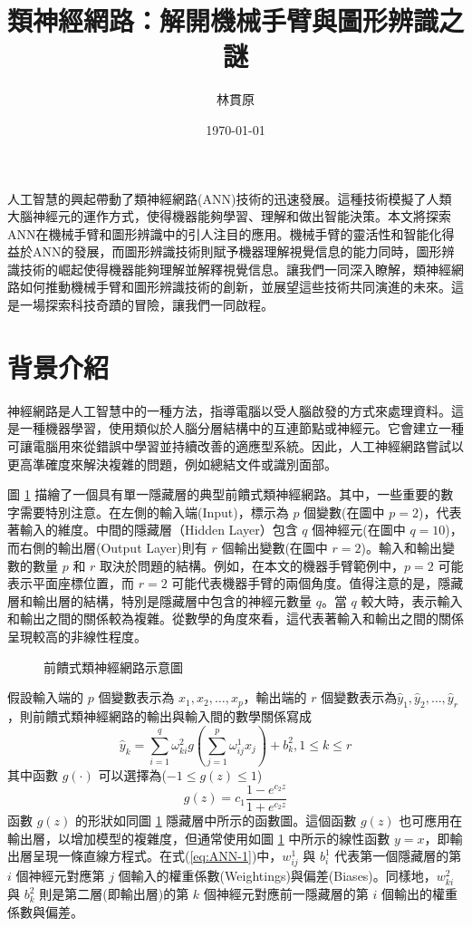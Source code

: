 \documentclass[12pt, a4paper]{article}
\title{類神經網路：解開機械手臂與圖形辨識之謎}
\author{{\KT 林貫原}}
\date{{\R \today }}
\begin{document}
\renewcommand{\tablename}{表}	
\renewcommand{\figurename}{圖}
\maketitle
\fontsize{12}{22pt}\selectfont 


人工智慧的興起帶動了類神經網路(ANN)技術的迅速發展。這種技術模擬了人類大腦神經元的運作方式，使得機器能夠學習、理解和做出智能決策。本文將探索ANN在機械手臂和圖形辨識中的引人注目的應用。機械手臂的靈活性和智能化得益於ANN的發展，而圖形辨識技術則賦予機器理解視覺信息的能力同時，圖形辨識技術的崛起使得機器能夠理解並解釋視覺信息。讓我們一同深入瞭解，類神經網路如何推動機械手臂和圖形辨識技術的創新，並展望這些技術共同演進的未來。這是一場探索科技奇蹟的冒險，讓我們一同啟程。

\section{背景介紹}
神經網路是人工智慧中的一種方法，指導電腦以受人腦啟發的方式來處理資料。這是一種機器學習，使用類似於人腦分層結構中的互連節點或神經元。它會建立一種可讓電腦用來從錯誤中學習並持續改善的適應型系統。因此，人工神經網路嘗試以更高準確度來解決複雜的問題，例如總結文件或識別面部。

圖 \ref{fig:ANN(hidden1)} 描繪了一個具有單一隱藏層的典型前饋式類神經網路。其中，一些重要的數字需要特別注意。在左側的輸入端(Input)，標示為 $p$ 個變數(在圖中 $p = 2$)，代表著輸入的維度。中間的隱藏層（Hidden Layer）包含 $q$ 個神經元(在圖中 $q = 10$)，而右側的輸出層(Output Layer)則有 $r$ 個輸出變數(在圖中 $r = 2$)。輸入和輸出變數的數量 $p$ 和 $r$ 取決於問題的結構。例如，在本文的機器手臂範例中，$p = 2$ 可能表示平面座標位置，而 $r = 2$ 可能代表機器手臂的兩個角度。值得注意的是，隱藏層和輸出層的結構，特別是隱藏層中包含的神經元數量 $q$。當 $q$ 較大時，表示輸入和輸出之間的關係較為複雜。從數學的角度來看，這代表著輸入和輸出之間的關係呈現較高的非線性程度。
\begin{figure}[H]
    \caption{前饋式類神經網路示意圖}
    \label{fig:ANN(hidden1)}
\end{figure}
假設輸入端的 $p$ 個變數表示為 $x_1, x_2,\dots , x_p$，輸出端的 $r$ 個變數表示為$\hat{y}_1, \hat{y}_2,\dots , \hat{y}_r$，則前饋式類神經網路的輸出與輸入間的數學關係寫成
\begin{equation}\label{eq:ANN-1}
\hat{y}_k=\sum_{i=1}^q\omega^2_{ki}g\left(\sum_{j=1}^p\omega^1_{ij}x_j\right)+b^2_k,1\leq k\leq r
\end{equation}
其中函數 $g(·)$ 可以選擇為($−1\leq g(z)\leq 1$)
\begin{equation}\label{eq:ANN-2}
g(z)=c_1\frac{1-e^{c_2z}}{1+e^{c_2z}}
\end{equation}
函數 $g(z)$ 的形狀如同圖 \ref{fig:ANN(hidden1)} 隱藏層中所示的函數圖。這個函數 $g(z)$ 也可應用在輸出層，以增加模型的複雜度，但通常使用如圖 \ref{fig:ANN(hidden1)} 中所示的線性函數 $y = x$，即輸出層呈現一條直線方程式。在式(\ref{eq:ANN-1})中，$w^1_{ij}$ 與 $b^1_i$ 代表第一個隱藏層的第 $i$ 個神經元對應第 $j$ 個輸入的權重係數(Weightings)與偏差(Biases)。同樣地，$w^2_{ki}$ 與 $b^2_k$ 則是第二層(即輸出層)的第 $k$ 個神經元對應前一隱藏層的第 $i$ 個輸出的權重係數與偏差。
\end{document}

